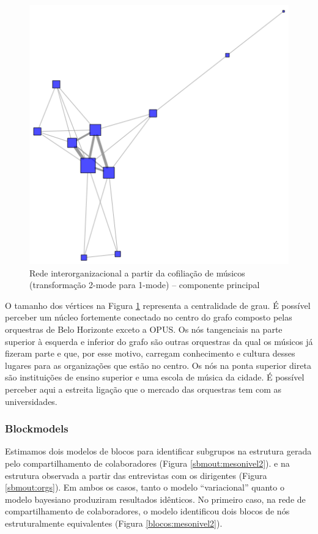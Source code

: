 \documentclass[a4paper, 12pt, openright, oneside, german, french, english, brazil]{abntex2}
\begin{document}
	\begin{figure}[!ht]
		\centering
		\caption{Rede interorganizacional a partir da cofiliação de músicos (transformação 2-mode para 1-mode) -- componente principal}
		\label{rede:mesonivel2}
		\includegraphics[scale=.7]{mesonivel2.png}
	\end{figure}

	O tamanho dos vértices na Figura \ref{rede:mesonivel2} representa a centralidade de grau. É possível perceber um núcleo fortemente conectado no centro do grafo composto pelas orquestras de Belo Horizonte exceto a OPUS. Os nós tangenciais na parte superior à esquerda e inferior do grafo são outras orquestras da qual os músicos já fizeram parte e que, por esse motivo, carregam conhecimento e cultura desses lugares para as organizações que estão no centro. Os nós na ponta superior direta são instituições de ensino superior e uma escola de música da cidade. É possível perceber aqui a estreita ligação que o mercado das orquestras tem com as universidades.
	
	\subsubsection{Blockmodels}
	
	Estimamos dois modelos de blocos para identificar subgrupos na estrutura gerada pelo compartilhamento de colaboradores (Figura \ref{sbmout:mesonivel2}). e na estrutura observada a partir das entrevistas com os dirigentes (Figura \ref{sbmout:orgs}). Em ambos os casos, tanto o modelo ``variacional'' quanto o modelo bayesiano produziram resultados idênticos. No primeiro caso, na rede de compartilhamento de colaboradores, o modelo identificou dois blocos de nós estruturalmente equivalentes (Figura \ref{blocos:mesonivel2}).
	
\end{document}
